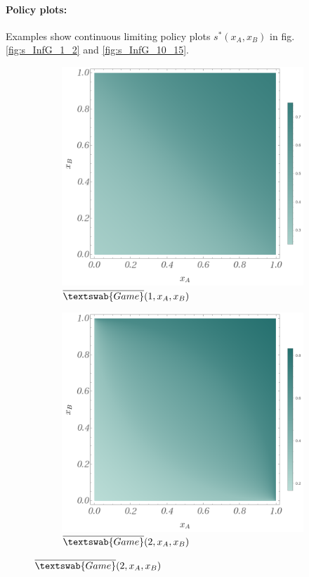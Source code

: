 \documentclass{article}
\theoremstyle{definition}
\newcommand{\InfG}[1]{$\overline{\textswab{Game}}(#1)$}
\begin{document}
\paragraph{Policy plots:} Examples show continuous limiting policy plots $s^*(x_A,x_B)$ in fig. \ref{fig:s_InfG_1_2} and \ref{fig:s_InfG_10_15}.


\begin{figure}[H]
    \centering
    \begin{subfigure}[b]{0.4\textwidth}
        \includegraphics[width=\textwidth]{img/BinomialFisher_s_1.png}
        \caption{\InfG{1,x_A,x_B}}
        \label{fig:sG_1}
    \end{subfigure}
    \hspace{0.05\textwidth} %
    \begin{subfigure}[b]{0.4\textwidth}
        \includegraphics[width=\textwidth]{img/BinomialFisher_s_2.png}
        \caption{\InfG{2,x_A,x_B}}
        \label{fig:sG_2}
    \end{subfigure}
    

\end{figure}
\end{document}
